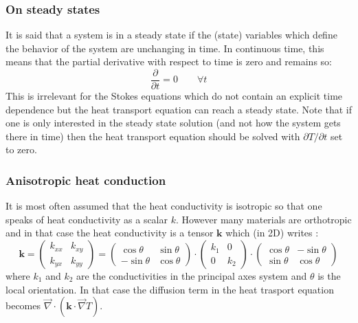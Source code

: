 \subsubsection{On steady states}

It is said that a system is in a steady state if the (state) variables which define the behavior of the system 
are unchanging in time. In continuous time, this means that the partial derivative with respect to time is zero and remains so:
\[
\frac{\partial}{\partial t} =0 \qquad \forall t
\]
This is irrelevant for the Stokes equations which do not contain an explicit time dependence but the heat 
transport equation can reach a steady state. 
Note that if one is only interested in the steady state solution (and not how the system gets there in time)
then the heat transport equation should be solved with $\partial T/\partial t$ set to zero. 

\subsubsection{Anisotropic heat conduction}\label{sec:anisotropic}


It is most often assumed that the heat conductivity is isotropic so that one speaks of heat conductivity as a 
scalar $k$.  However many materials are orthotropic and in that case the heat conductivity is a tensor ${\bm k}$
which (in 2D) writes \cite[p121]{reddybook2}:
\[
{\bm k}
=
\left(
\begin{array}{cc}
k_{xx} & k_{xy} \\
k_{yx} & k_{yy}
\end{array}
\right)
=
\left(
\begin{array}{cc}
\cos\theta & \sin\theta \\
-\sin\theta & \cos\theta
\end{array}
\right)
\cdot
\left(
\begin{array}{cc}
k_1 & 0 \\ 0 & k_2
\end{array}
\right)
\cdot
\left(
\begin{array}{cc}
\cos\theta & -\sin\theta \\
\sin\theta & \cos\theta
\end{array}
\right)
\]
where $k_1$ and $k_2$ are the conductivities in the principal axes system and $\theta$ is 
the local orientation.
In that case the diffusion term in the heat trasport equation becomes $\vec{\nabla}\cdot({\bm k}\cdot \vec{\nabla}T)$.


